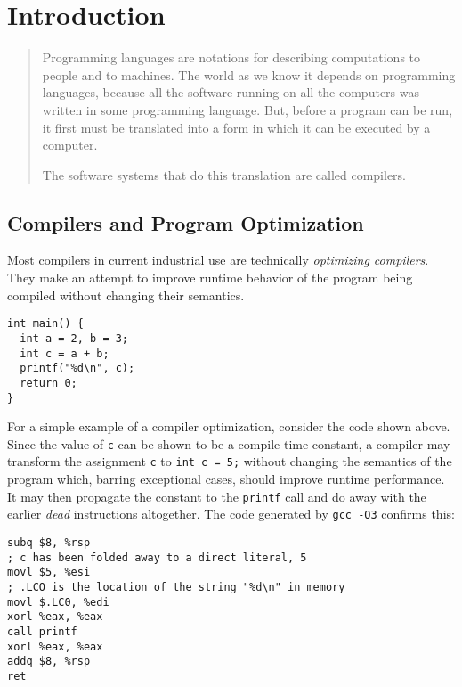 \chapter{Introduction}

\label{Chapter1}


\begin{quote}
Programming languages are notations for describing computations to
people and to machines.  The world as we know it depends on
programming languages, because all the software running on all the
computers was written in some programming language.  But, before a
program can be run, it first must be translated into a form in which
it can be executed by a computer.

The software systems that do this translation are called
compilers.\cite{dragonbook}
\end{quote}

\section{Compilers and Program Optimization}

Most compilers in current industrial use are technically
\emph{optimizing compilers}.  They make an attempt to improve runtime
behavior of the program being compiled without changing their
semantics.

\begin{verbatim}
int main() {
  int a = 2, b = 3;
  int c = a + b;
  printf("%d\n", c);
  return 0;
}
\end{verbatim}

For a simple example of a compiler optimization, consider the code
shown above.  Since the value of \texttt{c} can be shown to be a
compile time constant, a compiler may transform the assignment
\texttt{c} to \texttt{int c = 5;} without changing the semantics of
the program which, barring exceptional cases, should improve runtime
performance. It may then propagate the constant to the \texttt{printf}
call and do away with the earlier \emph{dead} instructions altogether.
The code generated by \texttt{gcc -O3} confirms this:

\begin{verbatim}
subq $8, %rsp
; c has been folded away to a direct literal, 5
movl $5, %esi
; .LCO is the location of the string "%d\n" in memory
movl $.LC0, %edi
xorl %eax, %eax
call printf
xorl %eax, %eax
addq $8, %rsp
ret
\end{verbatim}

